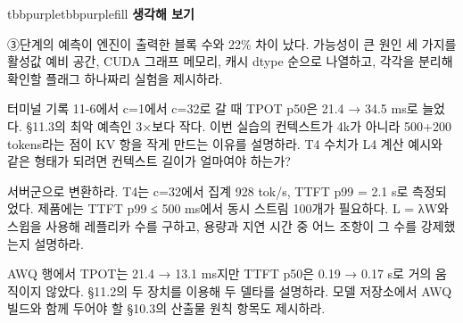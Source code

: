 \begin{calloutbox}{tbbpurple}{tbbpurplefill}
{\normalsize\bfseries\color{tbbpurple}생각해 보기}\par\vspace{3pt}
\begin{tbbitemize}
  \item ③단계의 예측이 엔진이 출력한 블록 수와 22\% 차이 났다. 가능성이 큰 원인 세 가지를 활성값 예비 공간, CUDA 그래프 메모리, 캐시 dtype 순으로 나열하고, 각각을 분리해 확인할 플래그 하나짜리 실험을 제시하라.
  \item 터미널 기록 11-6에서 c=1에서 c=32로 갈 때 TPOT p50은 21.4 → 34.5 ms로 늘었다. §11.3의 최악 예측인 3×보다 작다. 이번 실습의 컨텍스트가 4k가 아니라 500+200 tokens라는 점이 KV 항을 작게 만드는 이유를 설명하라. T4 수치가 L4 계산 예시와 같은 형태가 되려면 컨텍스트 길이가 얼마여야 하는가?
  \item 서버군으로 변환하라. T4는 c=32에서 집계 928 tok/s, TTFT p99 = 2.1 s로 측정되었다. 제품에는 TTFT p99 ≤ 500 ms에서 동시 스트림 100개가 필요하다. L = λW와 스윕을 사용해 레플리카 수를 구하고, 용량과 지연 시간 중 어느 조항이 그 수를 강제했는지 설명하라.
  \item AWQ 행에서 TPOT는 21.4 → 13.1 ms지만 TTFT p50은 0.19 → 0.17 s로 거의 움직이지 않았다. §11.2의 두 장치를 이용해 두 델타를 설명하라. 모델 저장소에서 AWQ 빌드와 함께 두어야 할 §10.3의 산출물 원칙 항목도 제시하라.
\end{tbbitemize}
\end{calloutbox}





